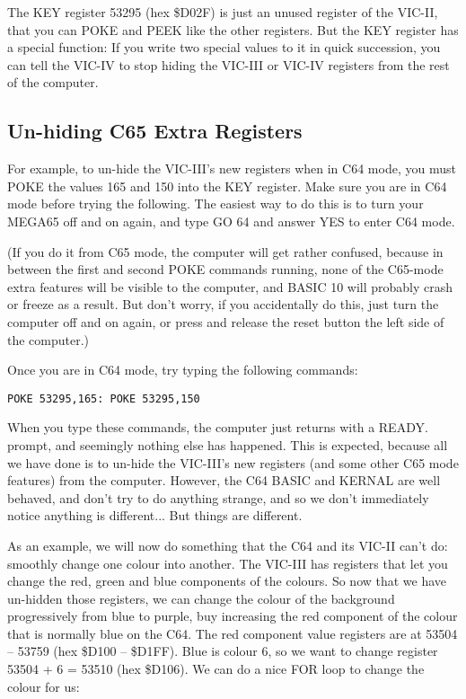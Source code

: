 The KEY register 53295 (hex \$D02F) is just an unused register of the VIC-II, that you can POKE and
PEEK like the other registers.  But the KEY register has a special function: If
you write two special values to it in quick succession, you can tell the VIC-IV
to stop hiding the VIC-III or VIC-IV registers from the rest of the computer.

\subsection{Un-hiding C65 Extra Registers}

For example, to un-hide the VIC-III's new registers when in C64 mode, you must POKE the values 165 and 150
into the KEY register. Make sure you are in C64 mode before trying the following.  The easiest way to do this
is to turn your MEGA65 off and on again, and type GO 64 and answer YES to enter C64 mode.

(If you do it from
C65 mode, the computer will get rather confused, because in between the first and second POKE commands running,
none of the C65-mode extra features will be visible to the computer, and BASIC 10 will probably crash or
freeze as a result. But don't worry, if you accidentally do this, just turn the computer off and on again,
or press and release the reset button the left side of the computer.)

Once you are in C64 mode, try typing the following commands:

\begin{tcolorbox}[colback=black,coltext=white]
\verbatimfont{\codefont}
\begin{verbatim}
POKE 53295,165: POKE 53295,150
\end{verbatim}
\end{tcolorbox}

When you type these commands, the computer just returns with a READY. prompt, and seemingly nothing else has
happened.  This is expected, because all we have done is to un-hide the VIC-III's new registers (and some other
C65 mode features) from the computer.  However, the C64 BASIC and KERNAL are well behaved, and don't try to
do anything strange, and so we don't immediately notice anything is different... But things are different.

As an example, we will now do something that the C64 and its VIC-II can't do: smoothly change one colour into another.
The VIC-III has registers that let you change the red, green and blue components of the colours.  So now that we have
un-hidden those registers, we can change the colour of the background progressively from blue to purple, buy increasing
the red component of the colour that is normally blue on the C64.  The red component value registers are at
53504 -- 53759 (hex \$D100 -- \$D1FF).  Blue is colour 6, so we want to change register 53504 + 6 = 53510 (hex \$D106).
We can do a nice FOR loop to change the colour for us:

